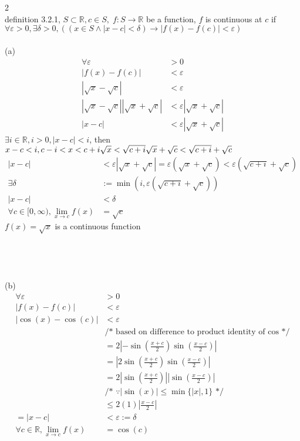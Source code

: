 \documentclass[12pt, border = 4pt, multi]{article} %
\begin{document}
\\
\\
2\\
definition 3.2.1, $S \subset \mathbb{R}, c \in S,\; f: S \rightarrow \mathbb{R}$ be a function, $f$ is continuous at $c$ if $\forall \varepsilon > 0, \exists \delta > 0, ((x \in S \wedge |x - c| < \delta) \rightarrow |f(x) - f(c)| < \varepsilon)$\\
\\
(a)\\
\begin{align*}
\forall \varepsilon &> 0\\
|f(x) - f(c)| &< \varepsilon\\
|\sqrt{x} - \sqrt{c}| &< \varepsilon\\
|\sqrt{x} - \sqrt{c}||\sqrt{x} + \sqrt{c}| &< \varepsilon |\sqrt{x} + \sqrt{c}|\\
|x - c| &< \varepsilon|\sqrt{x} + \sqrt{c}|
\end{align*}
$\exists i \in \mathbb{R}, i > 0, |x - c| < i$, then $x - c < i, c - i < x < c + i\\
\sqrt{x} < \sqrt{c + i}\\
\sqrt{x} + \sqrt{c} < \sqrt{c + i} + \sqrt{c}$\\
\begin{align*}
|x - c| &< \varepsilon|\sqrt{x} + \sqrt{c}| = \varepsilon(\sqrt{x} + \sqrt{c}) < \varepsilon(\sqrt{c + i} + \sqrt{c})\\
\exists \delta &:= \min(i, \varepsilon(\sqrt{c + i} + \sqrt{c}))\\
|x - c| &< \delta\\
\forall c \in [0, \infty), \lim_{x \rightarrow c} f(x) &= \sqrt{c}
\end{align*}
$f(x) = \sqrt{x}$ is a continuous function\\
\\
\\
\\
\\
(b)
\begin{align*}
\forall \varepsilon &> 0\\
|f(x) - f(c)| &< \varepsilon\\
|\cos(x) - \cos(c)| &< \varepsilon\\
&\text{/* based on difference to product identity of cos */}\\
&= 2\left|-\sin\left(\frac{x + c}{2}\right)\sin\left(\frac{x - c}{2}\right)\right|\\
&= \left|2\sin\left(\frac{x + c}{2}\right)\sin\left(\frac{x - c}{2}\right)\right|\\
&= 2\left|\sin\left(\frac{x + c}{2}\right)\right|\left|\sin\left(\frac{x - c}{2}\right)\right|\\
&\textbf{/* }\because |\sin(x)| \leq \min\{|x|, 1\}\text{ */}\\
&\leq 2(1)\left|\frac{x - c}{2}\right|\\
= |x - c| &< \varepsilon := \delta\\
\forall c \in \mathbb{R}, \lim_{x \rightarrow c} f(x) &= \cos(c)
\end{align*}
\end{document}
